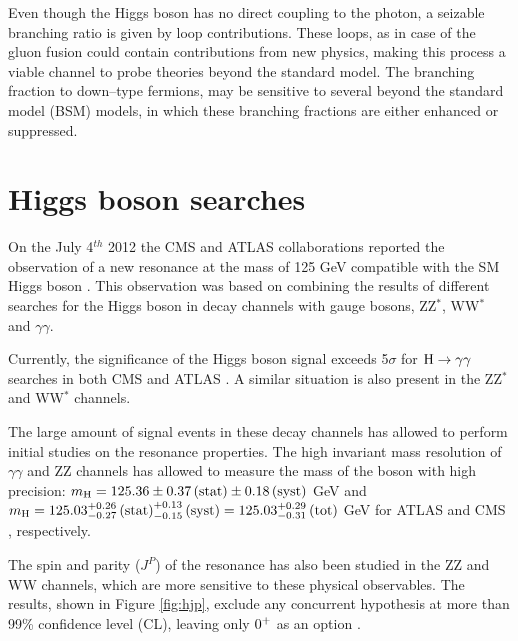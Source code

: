 Even though the Higgs boson has no direct coupling to the photon, a seizable branching ratio is given by loop contributions. These loops, as in case of the gluon fusion could contain contributions from new physics, making this process a viable channel to probe theories beyond the standard model. The branching fraction to down--type fermions, may be sensitive to several beyond the standard model (BSM) models, in which these branching fractions are either enhanced or suppressed.

\section{Higgs boson searches}

On the July 4$^{th}$ 2012 the CMS and ATLAS collaborations reported the observation of a new resonance at the mass of 125 GeV compatible with the SM Higgs boson \cite{Chatrchyan:2013lba}. This observation was based on combining the results of different searches for the Higgs boson in decay channels with gauge bosons, ZZ$^\ast$, WW$^\ast$ and $\gamma\gamma$.

Currently, the significance of the Higgs boson signal exceeds 5$\sigma$ for $\mathrm{H}\rightarrow\gamma\gamma$ searches in both CMS and ATLAS \cite{Khachatryan:2014ira, ATLASCONF:2014009}. A similar situation is also present in the ZZ$^\ast$ and WW$^\ast$ channels.

The large amount of signal events in these decay channels has allowed to perform initial studies on the resonance properties. The high invariant mass resolution of $\gamma\gamma$ and ZZ channels has allowed to measure the mass of the boson with high precision: $m_{\mathrm{H}} = 125.36 \pm 0.37\, \mathrm{(stat)} \pm 0.18\, \mathrm{(syst)}$ GeV and $m_{\mathrm{H}} = 125.03^{+0.26}_{-0.27} \,\mathrm{(stat)}^{+0.13}_{-0.15}  \,\mathrm{(syst)} = 125.03^{+0.29}_{-0.31} \, \mathrm{(tot)}$ GeV for ATLAS \cite{Aad:2014aba} and CMS \cite{CMS:2014ega}, respectively.

The spin and parity ($J^P$) of the resonance has also been studied in the ZZ and WW channels, which are more sensitive to these physical observables. The results, shown in Figure \ref{fig:hjp}, exclude any concurrent hypothesis at more than 99\% confidence level (CL), leaving only $0^{+}$ as an option \cite{CMS:2014gga}.

